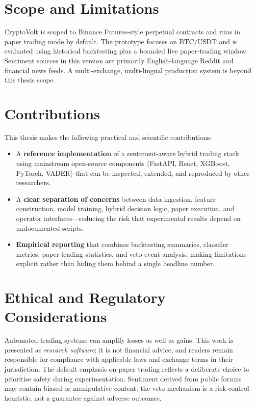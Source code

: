\section{Scope and Limitations}
CryptoVolt is scoped to Binance Futures-style perpetual contracts and runs in paper trading mode by default. The prototype focuses on BTC/USDT and is evaluated using historical backtesting plus a bounded live paper-trading window. Sentiment sources in this version are primarily English-language Reddit and financial news feeds. A multi-exchange, multi-lingual production system is beyond this thesis scope.

\section{Contributions}
This thesis makes the following practical and scientific contributions:
\begin{itemize}
  \item A \textbf{reference implementation} of a sentiment-aware hybrid trading stack using mainstream open-source components (FastAPI, React, XGBoost, PyTorch, VADER) that can be inspected, extended, and reproduced by other researchers.
  \item A \textbf{clear separation of concerns} between data ingestion, feature construction, model training, hybrid decision logic, paper execution, and operator interfaces—reducing the risk that experimental results depend on undocumented scripts.
  \item \textbf{Empirical reporting} that combines backtesting summaries, classifier metrics, paper-trading statistics, and veto-event analysis, making limitations explicit rather than hiding them behind a single headline number.
\end{itemize}

\section{Ethical and Regulatory Considerations}
Automated trading systems can amplify losses as well as gains. This work is presented as \emph{research software}; it is not financial advice, and readers remain responsible for compliance with applicable laws and exchange terms in their jurisdiction. The default emphasis on paper trading reflects a deliberate choice to prioritise safety during experimentation. Sentiment derived from public forums may contain biased or manipulative content; the veto mechanism is a risk-control heuristic, not a guarantee against adverse outcomes.


